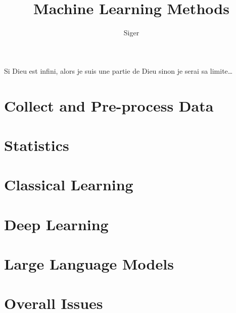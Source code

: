 \documentclass[a4paper, 10pt]{report}
\title{Machine Learning Methods}
\author{Siger}
\begin{document}
\maketitle

Si Dieu est infini, alors je suis une partie de Dieu sinon je serai sa limite\ldots

\tableofcontents

\part{Collect and Pre-process Data}


\part{Statistics}


\part{Classical Learning}


\part{Deep Learning}


\part{Large Language Models}


\part{Overall Issues}


\printbibliography
\end{document}
